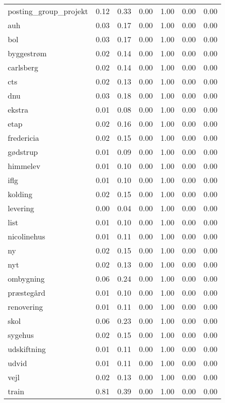\begin{landscape}
\begin{longtable}[h!]{lllllll}
posting_group_projekt & 0.12 & 0.33 & 0.00 & 1.00 & 0.00 & 0.00 \\
auh & 0.03 & 0.17 & 0.00 & 1.00 & 0.00 & 0.00 \\
bol & 0.03 & 0.17 & 0.00 & 1.00 & 0.00 & 0.00 \\
byggestrøm & 0.02 & 0.14 & 0.00 & 1.00 & 0.00 & 0.00 \\
carlsberg & 0.02 & 0.14 & 0.00 & 1.00 & 0.00 & 0.00 \\
cts & 0.02 & 0.13 & 0.00 & 1.00 & 0.00 & 0.00 \\
dnu & 0.03 & 0.18 & 0.00 & 1.00 & 0.00 & 0.00 \\
ekstra & 0.01 & 0.08 & 0.00 & 1.00 & 0.00 & 0.00 \\
etap & 0.02 & 0.16 & 0.00 & 1.00 & 0.00 & 0.00 \\
fredericia & 0.02 & 0.15 & 0.00 & 1.00 & 0.00 & 0.00 \\
gødstrup & 0.01 & 0.09 & 0.00 & 1.00 & 0.00 & 0.00 \\
himmelev & 0.01 & 0.10 & 0.00 & 1.00 & 0.00 & 0.00 \\
iflg & 0.01 & 0.10 & 0.00 & 1.00 & 0.00 & 0.00 \\
kolding & 0.02 & 0.15 & 0.00 & 1.00 & 0.00 & 0.00 \\
levering & 0.00 & 0.04 & 0.00 & 1.00 & 0.00 & 0.00 \\
list & 0.01 & 0.10 & 0.00 & 1.00 & 0.00 & 0.00 \\
nicolinehus & 0.01 & 0.11 & 0.00 & 1.00 & 0.00 & 0.00 \\
ny & 0.02 & 0.15 & 0.00 & 1.00 & 0.00 & 0.00 \\
nyt & 0.02 & 0.13 & 0.00 & 1.00 & 0.00 & 0.00 \\
ombygning & 0.06 & 0.24 & 0.00 & 1.00 & 0.00 & 0.00 \\
præstegård & 0.01 & 0.10 & 0.00 & 1.00 & 0.00 & 0.00 \\
renovering & 0.01 & 0.11 & 0.00 & 1.00 & 0.00 & 0.00 \\
skol & 0.06 & 0.23 & 0.00 & 1.00 & 0.00 & 0.00 \\
sygehus & 0.02 & 0.15 & 0.00 & 1.00 & 0.00 & 0.00 \\
udskiftning & 0.01 & 0.11 & 0.00 & 1.00 & 0.00 & 0.00 \\
udvid & 0.01 & 0.11 & 0.00 & 1.00 & 0.00 & 0.00 \\
vejl & 0.02 & 0.13 & 0.00 & 1.00 & 0.00 & 0.00 \\
train & 0.81 & 0.39 & 0.00 & 1.00 & 0.00 & 0.00 \\
\end{longtable}\end{landscape}
